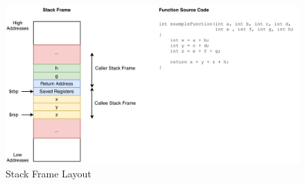 \begin{figure}[htp!]
\centering
    \includegraphics[width=\textwidth]{assets/figures/frame.pdf}
    \caption{Stack Frame Layout}
    \label{fig:stack-frame-layout}
\end{figure}
